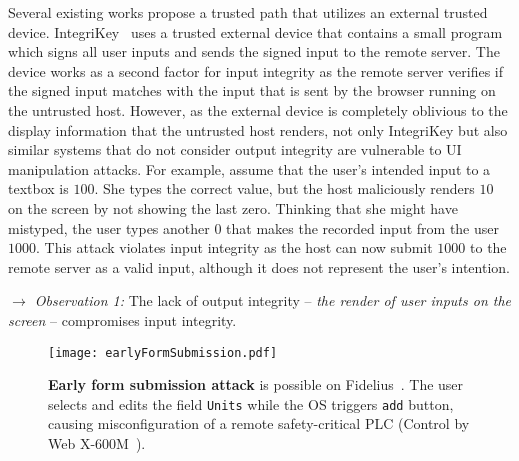  Several existing works propose a trusted path that utilizes an external trusted device. IntegriKey~\cite{IntegriKey} uses a trusted external device that contains a small program which signs all user inputs and sends the signed input to the remote server. The device works as a second factor for input integrity as the remote server verifies if the signed input matches with the input that is sent by the browser running on the untrusted host. However, as the external device is completely oblivious to the display information that the untrusted host renders, not only IntegriKey but also similar systems that do not consider output integrity are vulnerable to UI manipulation attacks. For example, assume that the user's intended input to a textbox is $100$. She types the correct value, but the host maliciously renders $10$ on the screen by not showing the last zero. Thinking that she might have mistyped, the user types another $0$ that makes the recorded input from the user $1000$. This attack violates input integrity as the host can now submit $1000$ to the remote server as a valid input, although it does not represent the user's intention. 

\noindent\emph{$\rightarrow$ Observation 1:} The lack of output integrity -- \emph{the render of user inputs on the screen} -- compromises input integrity.

\begin{figure}[t]
\centering
\texttt{[image: earlyFormSubmission.pdf]}
\caption{\textbf{Early form submission attack} is possible on Fidelius~\cite{Fidelius}. The user selects and edits the field \texttt{Units} while the OS triggers \texttt{add} button, causing misconfiguration of a remote safety-critical PLC (Control by Web X-600M~\cite{controlbyweb}).}
\spacesave
\label{fig:clickJack}
\centering 
\end{figure}

